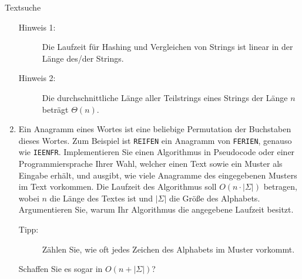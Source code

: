 \documentclass[11pt,a4paper]{article}
\begin{document}
\begin{aufgabe}{3}{Textsuche}
\begin{enumerate}[label=\alph*)]
\begin{description}
            \item[Hinweis 1:] Die Laufzeit für Hashing und Vergleichen von Strings ist linear in der Länge des/der Strings.
            \item[Hinweis 2:] Die durchschnittliche Länge aller Teilstrings eines Strings der Länge $n$ beträgt $\Theta(n)$.
        \end{description}
        \item \hard Ein Anagramm eines Wortes ist eine beliebige Permutation der Buchstaben dieses Wortes.
        Zum Beispiel ist \texttt{REIFEN} ein Anagramm von \texttt{FERIEN}, genauso wie \texttt{IEENFR}.
        Implementieren Sie einen Algorithmus in Pseudocode oder einer Programmiersprache Ihrer Wahl, welcher einen Text sowie ein Muster als Eingabe erhält, und ausgibt, wie viele Anagramme des eingegebenen Musters im Text vorkommen.
        Die Laufzeit des Algorithmus soll $O(n \cdot |\Sigma|)$ betragen, wobei $n$ die Länge des Textes ist und $|\Sigma|$ die Größe des Alphabets.
        Argumentieren Sie, warum Ihr Algorithmus die angegebene Laufzeit besitzt.
        \begin{description}
            \item[Tipp:] Zählen Sie, wie oft jedes Zeichen des Alphabets im Muster vorkommt.
        \end{description}
        Schaffen Sie es sogar in $O(n + |\Sigma|)$?
    \end{enumerate}
    
\end{aufgabe}
\end{document}
